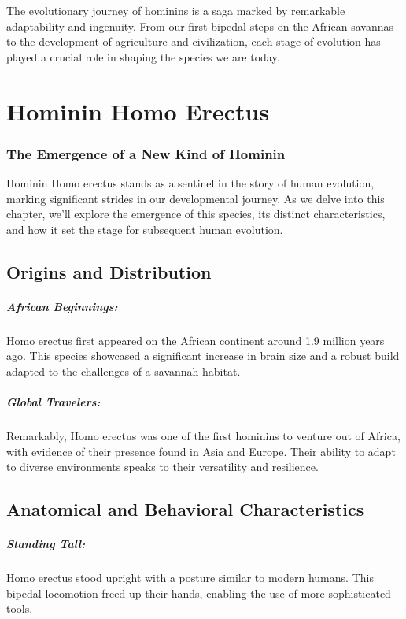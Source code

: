 \documentclass{book}
\begin{document}
The evolutionary journey of hominins is a saga marked by remarkable adaptability and ingenuity. From our first bipedal steps on the African savannas to the development of agriculture and civilization, each stage of evolution has played a crucial role in shaping the species we are today.

\chapter{Hominin Homo Erectus}
\subsection*{The Emergence of a New Kind of Hominin}
Hominin Homo erectus stands as a sentinel in the story of human evolution, marking significant strides in our developmental journey. As we delve into this chapter, we'll explore the emergence of this species, its distinct characteristics, and how it set the stage for subsequent human evolution.

\section*{Origins and Distribution}

\paragraph{African Beginnings:}
Homo erectus first appeared on the African continent around 1.9 million years ago. This species showcased a significant increase in brain size and a robust build adapted to the challenges of a savannah habitat.

\paragraph{Global Travelers:}
Remarkably, Homo erectus was one of the first hominins to venture out of Africa, with evidence of their presence found in Asia and Europe. Their ability to adapt to diverse environments speaks to their versatility and resilience.

\section*{Anatomical and Behavioral Characteristics}

\paragraph{Standing Tall:}
Homo erectus stood upright with a posture similar to modern humans. This bipedal locomotion freed up their hands, enabling the use of more sophisticated tools.
\end{document}

